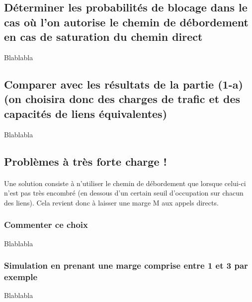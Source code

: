         \subsection{Déterminer les probabilités de blocage dans le cas où l'on autorise le chemin de débordement en cas de saturation du chemin direct}
Blablabla
%
        \subsection{Comparer avec les résultats de la partie (1-a) (on choisira donc des charges de trafic et des capacités de liens équivalentes)}
Blablabla
%
        \subsection{Problèmes à très forte charge !}
            \paragraph{}
Une solution consiste à n'utiliser le chemin de débordement que lorsque celui-ci n'est pas très encombré (en dessous d'un certain seuil d'occupation sur chacun des liens).
Cela revient donc à laisser une marge M aux appels directs.
%
            \subsubsection{Commenter ce choix}
Blablabla
%
            \subsubsection{Simulation en prenant une marge comprise entre 1 et 3 par exemple}
Blablabla
%
    \clearpage
%
